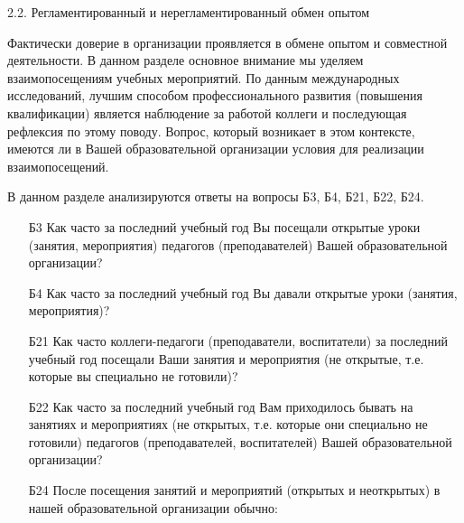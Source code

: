 \begin{frame}{2.2. Регламентированный и нерегламентированный обмен опытом}

\tiny
Фактически доверие в организации проявляется в обмене опытом и совместной деятельности. В данном разделе основное внимание мы уделяем взаимопосещениям учебных мероприятий. По данным международных исследований, лучшим способом профессионального развития (повышения квалификации) является наблюдение за работой коллеги и последующая рефлексия по этому поводу. Вопрос, который возникает в этом контексте, имеются ли в Вашей образовательной организации условия для реализации взаимопосещений. 
\bigskip

В данном разделе анализируются ответы на вопросы Б3, Б4, Б21, Б22, Б24.
\bigskip

\begin{itemize}

\item [Б3] Как часто за последний учебный год Вы посещали открытые уроки (занятия, мероприятия) педагогов (преподавателей)  Вашей образовательной организации?

\item [Б4] Как часто за последний учебный год Вы давали открытые уроки (занятия, мероприятия)?

\item [Б21] Как часто коллеги-педагоги (преподаватели, воспитатели) за последний учебный год посещали Ваши занятия и мероприятия (не открытые, т.е. которые вы специально не готовили)?

\item [Б22] Как часто за последний учебный год Вам приходилось бывать на занятиях и мероприятиях (не открытых, т.е. которые они специально не готовили) педагогов (преподавателей, воспитателей) Вашей образовательной организации?

\item [Б24] После посещения занятий  и мероприятий (открытых и неоткрытых)  в нашей образовательной организации  обычно:

\end{itemize}

\end{frame}


